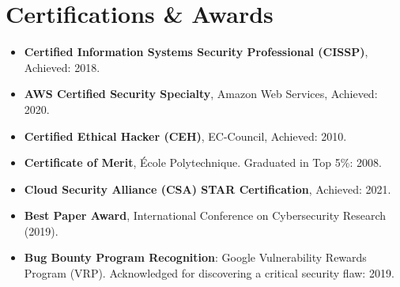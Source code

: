 
\section{Certifications \& Awards}

\begin{itemize}
    \item[\textrightarrow] \textbf{Certified Information Systems Security Professional (CISSP)}, Achieved: 2018. \vspace{0.13cm}
    \item[\textrightarrow] \textbf{AWS Certified Security Specialty}, Amazon Web Services, Achieved: 2020. \vspace{0.13cm}
    \item[\textrightarrow] \textbf{Certified Ethical Hacker (CEH)}, EC-Council, Achieved: 2010. \vspace{0.13cm}
    \item[\textrightarrow] \textbf{Certificate of Merit}, École Polytechnique. Graduated in Top 5\%: 2008. \vspace{0.13cm}
    \item[\textrightarrow] \textbf{Cloud Security Alliance (CSA) STAR Certification}, Achieved: 2021. \vspace{0.13cm}
    \item[\textrightarrow] \textbf{Best Paper Award}, International Conference on Cybersecurity Research (2019). \vspace{0.13cm}
    \item[\textrightarrow] \textbf{Bug Bounty Program Recognition}: Google Vulnerability Rewards Program (VRP). Acknowledged for discovering a critical security flaw: 2019.
\end{itemize}

